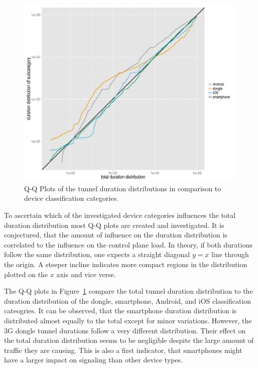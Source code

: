\begin{figure}[htb]
	\centering
	\includegraphics[width=1.0\textwidth]{images/R-duration-qq-category-comparison.pdf}
	\caption{Q-Q Plots of the tunnel duration distributions in comparison to device classification categories.}
\label{c4:fig:qq-plots}
\end{figure}


To ascertain which of the investigated device categories influences the total duration distribution most Q-Q plots are created and investigated. It is conjectured, that the amount of influence on the duration distribution is correlated to the influence on the control plane load. In theory, if both durations follow the same distribution, one expects a straight diagonal $y=x$ line through the origin. A steeper incline indicates more compact regions in the distribution plotted on the $x$ axis and vice verse.

The Q-Q plots in Figure~\ref{c4:fig:qq-plots} compare the total tunnel duration distribution to the duration distribution of the dongle, smartphone, Android, and iOS classification cateogries. It can be observed, that the smartphone duration distribution is distributed almost equally to the total except for minor variations. However, the \gls{3G} dongle tunnel durations follow a very different distribution. Their effect on the total duration distribution seems to be negligible despite the  large amount of traffic they are causing. This is also a first indicator, that smartphones might have a larger impact on signaling than other device types.

